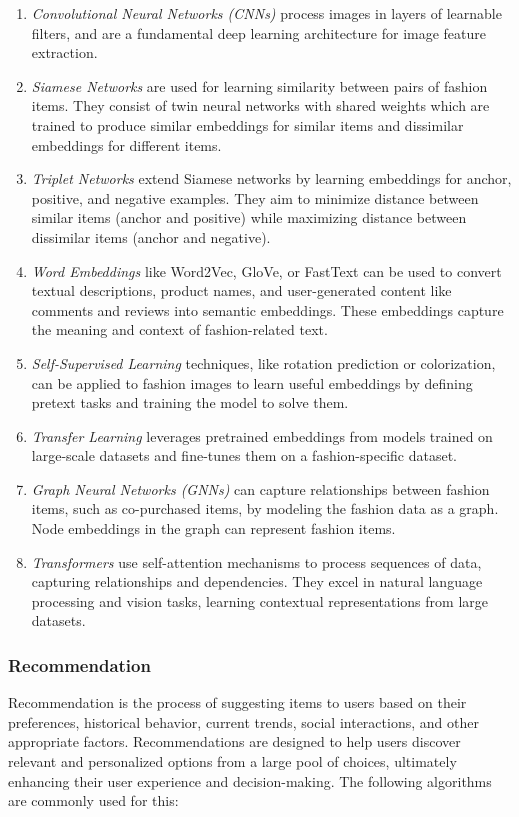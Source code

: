 			\begin{enumerate}
				\item \textit{Convolutional Neural Networks (CNNs)} process images in layers of learnable filters, and are a fundamental deep learning architecture for image feature extraction.
				\item \textit{Siamese Networks} are used for learning similarity between pairs of fashion items. They consist of twin neural networks with shared weights which are trained to produce similar embeddings for similar items and dissimilar embeddings for different items.
				\item \textit{Triplet Networks} extend Siamese networks by learning embeddings for anchor, positive, and negative examples. They aim to minimize distance between similar items (anchor and positive) while maximizing distance between dissimilar items (anchor and negative).
				\item \textit{Word Embeddings} like Word2Vec, GloVe, or FastText can be used to convert textual descriptions, product names, and user-generated content like comments and reviews into semantic embeddings. These embeddings capture the meaning and context of fashion-related text.
				\item \textit{Self-Supervised Learning} techniques, like rotation prediction or colorization, can be applied to fashion images to learn useful embeddings by defining pretext tasks and training the model to solve them.
				\item \textit{Transfer Learning} leverages pretrained embeddings from models trained on large-scale datasets and fine-tunes them on a fashion-specific dataset.
				\item \textit{Graph Neural Networks (GNNs)} can capture relationships between fashion items, such as co-purchased items, by modeling the fashion data as a graph. Node embeddings in the graph can represent fashion items.
				\item \textit{Transformers} use self-attention mechanisms to process sequences of data, capturing relationships and dependencies. They excel in natural language processing and vision tasks, learning contextual representations from large datasets.
			\end{enumerate}

		\subsubsection{Recommendation}
			Recommendation is the process of suggesting items to users based on their preferences, historical behavior, current trends, social interactions, and other appropriate factors. Recommendations are designed to help users discover relevant and personalized options from a large pool of choices, ultimately enhancing their user experience and decision-making. The following algorithms are commonly used for this:

